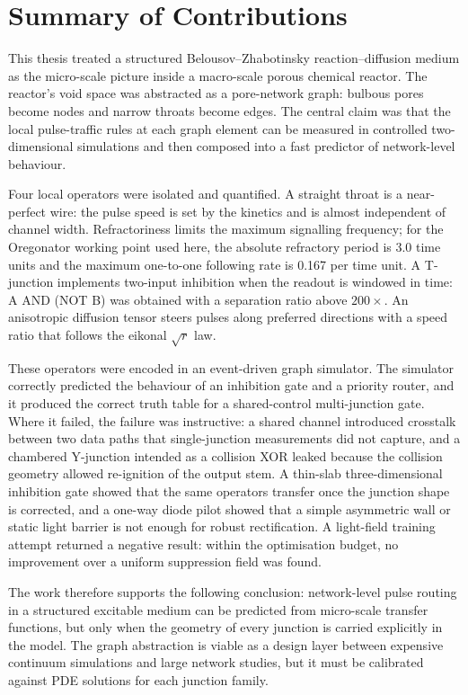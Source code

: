 
\section{Summary of Contributions}
\label{sec:conc_summary}

This thesis treated a structured Belousov--Zhabotinsky reaction--diffusion medium as the micro-scale picture inside a macro-scale porous chemical reactor.
The reactor's void space was abstracted as a pore-network graph: bulbous pores become nodes and narrow throats become edges.
The central claim was that the local pulse-traffic rules at each graph element can be measured in controlled two-dimensional simulations and then composed into a fast predictor of network-level behaviour.

Four local operators were isolated and quantified.
A straight throat is a near-perfect wire: the pulse speed is set by the kinetics and is almost independent of channel width.
Refractoriness limits the maximum signalling frequency; for the Oregonator working point used here, the absolute refractory period is 3.0 time units and the maximum one-to-one following rate is 0.167 per time unit.
A T-junction implements two-input inhibition when the readout is windowed in time: A AND (NOT B) was obtained with a separation ratio above $200\times$.
An anisotropic diffusion tensor steers pulses along preferred directions with a speed ratio that follows the eikonal $\sqrt{r}$ law.

These operators were encoded in an event-driven graph simulator.
The simulator correctly predicted the behaviour of an inhibition gate and a priority router, and it produced the correct truth table for a shared-control multi-junction gate.
Where it failed, the failure was instructive: a shared channel introduced crosstalk between two data paths that single-junction measurements did not capture, and a chambered Y-junction intended as a collision XOR leaked because the collision geometry allowed re-ignition of the output stem.
A thin-slab three-dimensional inhibition gate showed that the same operators transfer once the junction shape is corrected, and a one-way diode pilot showed that a simple asymmetric wall or static light barrier is not enough for robust rectification.
A light-field training attempt returned a negative result: within the optimisation budget, no improvement over a uniform suppression field was found.

The work therefore supports the following conclusion: network-level pulse routing in a structured excitable medium can be predicted from micro-scale transfer functions, but only when the geometry of every junction is carried explicitly in the model.
The graph abstraction is viable as a design layer between expensive continuum simulations and large network studies, but it must be calibrated against PDE solutions for each junction family.

